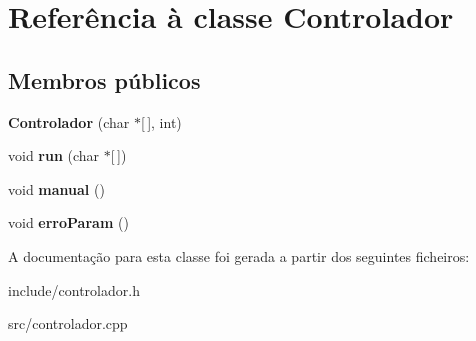 \hypertarget{classControlador}{\section{Referência à classe Controlador}
\label{classControlador}
}
\subsection*{Membros públicos}
\begin{DoxyCompactItemize}
\item 
\hypertarget{classControlador_a0d0bbcc593632f901eca4a31ea9d1362}{{\bfseries Controlador} (char $\ast$\mbox{[}$\,$\mbox{]}, int)}\label{classControlador_a0d0bbcc593632f901eca4a31ea9d1362}

\item 
\hypertarget{classControlador_ac9156c3d253298e6e2f339467f904380}{void {\bfseries run} (char $\ast$\mbox{[}$\,$\mbox{]})}\label{classControlador_ac9156c3d253298e6e2f339467f904380}

\item 
\hypertarget{classControlador_a12435d3a38e3514b122a4bacd992d4d5}{void {\bfseries manual} ()}\label{classControlador_a12435d3a38e3514b122a4bacd992d4d5}

\item 
\hypertarget{classControlador_a036fbbb2efd854b8eb40eff7f103cfa6}{void {\bfseries erro\-Param} ()}\label{classControlador_a036fbbb2efd854b8eb40eff7f103cfa6}

\end{DoxyCompactItemize}


A documentação para esta classe foi gerada a partir dos seguintes ficheiros\-:\begin{DoxyCompactItemize}
\item 
include/controlador.\-h\item 
src/controlador.\-cpp\end{DoxyCompactItemize}
